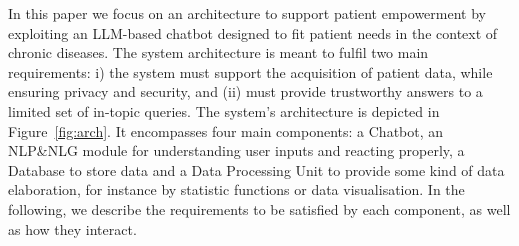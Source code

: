 \documentclass[preprint,12pt]{elsarticle}
\begin{document}
In this paper we focus on %
an architecture to support patient empowerment by exploiting an LLM-based chatbot designed to fit patient needs in the context of chronic diseases.
%
The system architecture is meant to fulfil two main requirements: 
%
i) the system must support the acquisition of patient data, while ensuring privacy and security, and 
(ii) must provide trustworthy answers to a limited set of in-topic queries.
%
The system's architecture is depicted in Figure~\ref{fig:arch}. 
 It encompasses four main components: a Chatbot, an NLP\&NLG module for understanding user inputs and reacting properly, a Database to store data and 
 a Data Processing Unit to provide some kind of data elaboration, for instance by statistic functions or data visualisation.
%
In the following, we describe the requirements to be satisfied by each component, as well as how they interact.

\end{document}
